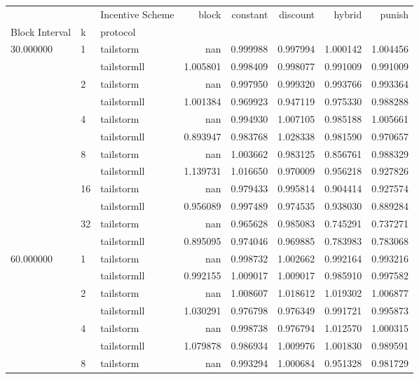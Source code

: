 \begin{tabular}{lllrrrrr}
 &  & Incentive Scheme & block & constant & discount & hybrid & punish \\
Block Interval & k & protocol &  &  &  &  &  \\
\multirow[c]{12}{*}{30.000000} & \multirow[c]{2}{*}{1} & tailstorm & nan & 0.999988 & 0.997994 & 1.000142 & 1.004456 \\
 &  & tailstormll & 1.005801 & 0.998409 & 0.998077 & 0.991009 & 0.991009 \\
 & \multirow[c]{2}{*}{2} & tailstorm & nan & 0.997950 & 0.999320 & 0.993766 & 0.993364 \\
 &  & tailstormll & 1.001384 & 0.969923 & 0.947119 & 0.975330 & 0.988288 \\
 & \multirow[c]{2}{*}{4} & tailstorm & nan & 0.994930 & 1.007105 & 0.985188 & 1.005661 \\
 &  & tailstormll & 0.893947 & 0.983768 & 1.028338 & 0.981590 & 0.970657 \\
 & \multirow[c]{2}{*}{8} & tailstorm & nan & 1.003662 & 0.983125 & 0.856761 & 0.988329 \\
 &  & tailstormll & 1.139731 & 1.016650 & 0.970009 & 0.956218 & 0.927826 \\
 & \multirow[c]{2}{*}{16} & tailstorm & nan & 0.979433 & 0.995814 & 0.904414 & 0.927574 \\
 &  & tailstormll & 0.956089 & 0.997489 & 0.974535 & 0.938030 & 0.889284 \\
 & \multirow[c]{2}{*}{32} & tailstorm & nan & 0.965628 & 0.985083 & 0.745291 & 0.737271 \\
 &  & tailstormll & 0.895095 & 0.974046 & 0.969885 & 0.783983 & 0.783068 \\
\multirow[c]{12}{*}{60.000000} & \multirow[c]{2}{*}{1} & tailstorm & nan & 0.998732 & 1.002662 & 0.992164 & 0.993216 \\
 &  & tailstormll & 0.992155 & 1.009017 & 1.009017 & 0.985910 & 0.997582 \\
 & \multirow[c]{2}{*}{2} & tailstorm & nan & 1.008607 & 1.018612 & 1.019302 & 1.006877 \\
 &  & tailstormll & 1.030291 & 0.976798 & 0.976349 & 0.991721 & 0.995873 \\
 & \multirow[c]{2}{*}{4} & tailstorm & nan & 0.998738 & 0.976794 & 1.012570 & 1.000315 \\
 &  & tailstormll & 1.079878 & 0.986934 & 1.009976 & 1.001830 & 0.989591 \\
 & \multirow[c]{2}{*}{8} & tailstorm & nan & 0.993294 & 1.000684 & 0.951328 & 0.981729 \\

\end{tabular}
